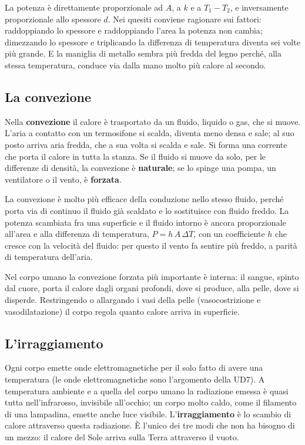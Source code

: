 \begin{attenzione}
La potenza è direttamente proporzionale ad $A$, a $k$ e a $T_1 - T_2$, e inversamente proporzionale allo spessore $d$. Nei quesiti conviene ragionare sui fattori: raddoppiando lo spessore e raddoppiando l'area la potenza non cambia; dimezzando lo spessore e triplicando la differenza di temperatura diventa sei volte più grande. E la maniglia di metallo sembra più fredda del legno perché, alla stessa temperatura, conduce via dalla mano molto più calore al secondo.
\end{attenzione}

\subsection{La convezione}

Nella \textbf{convezione} il calore è trasportato da un fluido, liquido o gas, che si muove. L'aria a contatto con un termosifone si scalda, diventa meno densa e sale; al suo posto arriva aria fredda, che a sua volta si scalda e sale. Si forma una corrente che porta il calore in tutta la stanza. Se il fluido si muove da solo, per le differenze di densità, la convezione è \textbf{naturale}; se lo spinge una pompa, un ventilatore o il vento, è \textbf{forzata}.

La convezione è molto più efficace della conduzione nello stesso fluido, perché porta via di continuo il fluido già scaldato e lo sostituisce con fluido freddo. La potenza scambiata fra una superficie e il fluido intorno è ancora proporzionale all'area e alla differenza di temperatura, $P = h\,A\,\Delta T$, con un coefficiente $h$ che cresce con la velocità del fluido: per questo il vento fa sentire più freddo, a parità di temperatura dell'aria.

Nel corpo umano la convezione forzata più importante è interna: il sangue, spinto dal cuore, porta il calore dagli organi profondi, dove si produce, alla pelle, dove si disperde. Restringendo o allargando i vasi della pelle (vasocostrizione e vasodilatazione) il corpo regola quanto calore arriva in superficie.

\subsection{L'irraggiamento}

Ogni corpo emette onde elettromagnetiche per il solo fatto di avere una temperatura (le onde elettromagnetiche sono l'argomento della UD7). A temperatura ambiente e a quella del corpo umano la radiazione emessa è quasi tutta nell'infrarosso, invisibile all'occhio; un corpo molto caldo, come il filamento di una lampadina, emette anche luce visibile. L'\textbf{irraggiamento} è lo scambio di calore attraverso questa radiazione. È l'unico dei tre modi che non ha bisogno di un mezzo: il calore del Sole arriva sulla Terra attraverso il vuoto.

